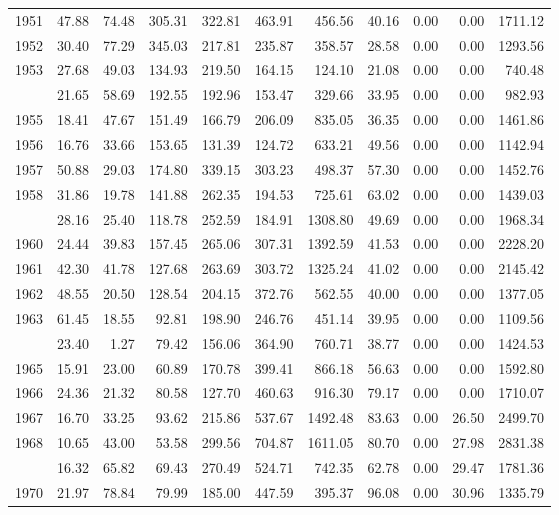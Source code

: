 \begin{longtable}[t]{rrrrrrrrrrr}
1951 & 47.88 & 74.48 & 305.31 & 322.81 & 463.91 & 456.56 & 40.16 & 0.00 & 0.00 & 1711.12\\
1952 & 30.40 & 77.29 & 345.03 & 217.81 & 235.87 & 358.57 & 28.58 & 0.00 & 0.00 & 1293.56\\
1953 & 27.68 & 49.03 & 134.93 & 219.50 & 164.15 & 124.10 & 21.08 & 0.00 & 0.00 & 740.48\\
\addlinespace
1954 & 21.65 & 58.69 & 192.55 & 192.96 & 153.47 & 329.66 & 33.95 & 0.00 & 0.00 & 982.93\\
1955 & 18.41 & 47.67 & 151.49 & 166.79 & 206.09 & 835.05 & 36.35 & 0.00 & 0.00 & 1461.86\\
1956 & 16.76 & 33.66 & 153.65 & 131.39 & 124.72 & 633.21 & 49.56 & 0.00 & 0.00 & 1142.94\\
1957 & 50.88 & 29.03 & 174.80 & 339.15 & 303.23 & 498.37 & 57.30 & 0.00 & 0.00 & 1452.76\\
1958 & 31.86 & 19.78 & 141.88 & 262.35 & 194.53 & 725.61 & 63.02 & 0.00 & 0.00 & 1439.03\\
\addlinespace
1959 & 28.16 & 25.40 & 118.78 & 252.59 & 184.91 & 1308.80 & 49.69 & 0.00 & 0.00 & 1968.34\\
1960 & 24.44 & 39.83 & 157.45 & 265.06 & 307.31 & 1392.59 & 41.53 & 0.00 & 0.00 & 2228.20\\
1961 & 42.30 & 41.78 & 127.68 & 263.69 & 303.72 & 1325.24 & 41.02 & 0.00 & 0.00 & 2145.42\\
1962 & 48.55 & 20.50 & 128.54 & 204.15 & 372.76 & 562.55 & 40.00 & 0.00 & 0.00 & 1377.05\\
1963 & 61.45 & 18.55 & 92.81 & 198.90 & 246.76 & 451.14 & 39.95 & 0.00 & 0.00 & 1109.56\\
\addlinespace
1964 & 23.40 & 1.27 & 79.42 & 156.06 & 364.90 & 760.71 & 38.77 & 0.00 & 0.00 & 1424.53\\
1965 & 15.91 & 23.00 & 60.89 & 170.78 & 399.41 & 866.18 & 56.63 & 0.00 & 0.00 & 1592.80\\
1966 & 24.36 & 21.32 & 80.58 & 127.70 & 460.63 & 916.30 & 79.17 & 0.00 & 0.00 & 1710.07\\
1967 & 16.70 & 33.25 & 93.62 & 215.86 & 537.67 & 1492.48 & 83.63 & 0.00 & 26.50 & 2499.70\\
1968 & 10.65 & 43.00 & 53.58 & 299.56 & 704.87 & 1611.05 & 80.70 & 0.00 & 27.98 & 2831.38\\
\addlinespace
1969 & 16.32 & 65.82 & 69.43 & 270.49 & 524.71 & 742.35 & 62.78 & 0.00 & 29.47 & 1781.36\\
1970 & 21.97 & 78.84 & 79.99 & 185.00 & 447.59 & 395.37 & 96.08 & 0.00 & 30.96 & 1335.79\\

\end{longtable}
